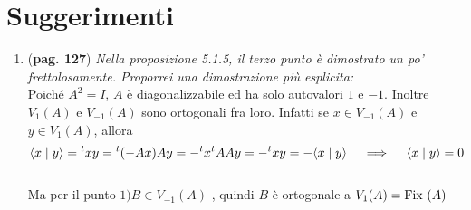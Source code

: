 \documentclass[a4paper,NoNotes,GeneralMath]{stdmdoc}
\begin{document}
	\section*{Suggerimenti}
	\begin{enumerate}
		\item ({\bf pag. 127}) {\it Nella proposizione 5.1.5, il terzo punto è dimostrato un po' frettolosamente. Proporrei una dimostrazione più esplicita: } \\
		Poiché $A^2 = I$, $A$ è diagonalizzabile ed ha solo autovalori $1$ e $-1$. Inoltre $V_1(A)$ e $V_{-1}(A)$ sono ortogonali fra loro. Infatti se $x \in V_{-1}(A)$ e $y \in V_1(A)$, allora $$\langle x \mid y \rangle = {}^txy = {}^t(-Ax)Ay = -{}^tx {}^tA Ay = -{}^txy = -\langle x \mid y \rangle \quad \implies \quad \langle x \mid y \rangle = 0 $$ \\ Ma per il punto $1) B\in V_{-1}(A)$ , quindi $B$ è ortogonale a $V_1(A) = \mbox{Fix }(A)$
	\end{enumerate}
\end{document}
